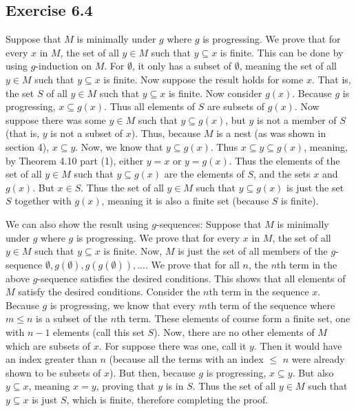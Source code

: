 \documentclass{article}
\theoremstyle{definition}
\begin{document}
\subsection*{Exercise 6.4}
Suppose that $M$ is minimally under $g$ where $g$ is progressing. We prove that for every $x$ in $M$, the set of all $y\in M$ such that
$y\subseteq x$ is finite. This can be done by using $g$-induction on $M$. For $\emptyset$, it only has a subset of $\emptyset$, meaning the set of all $y\in M$ 
such that $y\subseteq x$ is finite. Now suppose the result holds for some $x$. That is, the set $S$ of all $y\in M$ such that $y\subseteq x$ is finite. Now consider 
$g(x)$. Because $g$ is progressing, $x\subseteq g(x)$. Thus all elements of $S$ are subsets of $g(x)$. Now suppose there was some $y\in M$ such that $y\subseteq g(x)$, but 
$y$ is not a member of $S$ (that is, $y$ is not a subset of $x$). Thus, because $M$ is a nest (as was shown in section 4), $x\subseteq y$. Now, we know that 
$y\subseteq g(x)$. Thus $x\subseteq y\subseteq g(x)$, meaning, by Theorem 4.10 part (1), either $y=x$ or $y=g(x)$. Thus the elements of the set of all $y\in M$ such that 
$y\subseteq g(x)$ are the elements of $S$, and the sets $x$ and $g(x)$. But $x\in S$. Thus the set of all $y\in M$ such that 
$y\subseteq g(x)$ is just the set $S$ together with $g(x)$, meaning it is also a finite set (because $S$ is finite).


We can also show the result using $g$-sequences:
Suppose that $M$ is minimally under $g$ where $g$ is progressing. We prove that for every $x$ in $M$, the set of all $y\in M$ such that 
$y\subseteq x$ is finite. Now, $M$ is just the set of all members of the $g$-sequence $\emptyset,g(\emptyset),g(g(\emptyset)),...$. We prove that for all $n$, the 
$n$th term in the above $g$-sequence satisfies the desired conditions. This shows that all elements of $M$ satisfy the desired conditions. Consider the $n$th term in the 
sequence $x$. Because $g$ is progressing, we 
know that every $m$th term of the sequence where $m\le n$ is a subset of the $n$th term. These elements of course form a finite set, one with $n-1$ elements (call this set 
$S$). Now, there are 
no other elements of $M$ which are subsets of $x$. For suppose there was one, call it $y$. 
Then it would have an index greater than $n$ (because all the terms with an index $\le$ $n$ 
were already shown to be subsets of $x$). But then, because $g$ is progressing, $x\subseteq y$. But also $y\subseteq x$, meaning $x=y$, proving that $y$ is in $S$. Thus 
the set of all $y\in M$ such that $y\subseteq x$ is just $S$, which is finite, therefore completing the proof.
\end{document}
